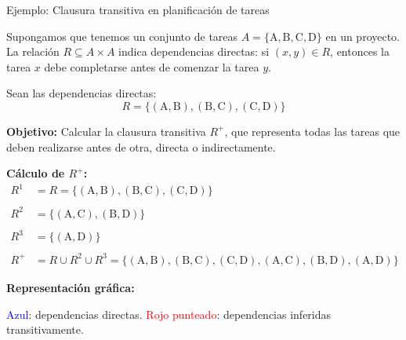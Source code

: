 \begin{exampleblock}{Ejemplo: Clausura transitiva en planificación de tareas}

Supongamos que tenemos un conjunto de tareas \( A = \{\text{A}, \text{B}, \text{C}, \text{D}\} \) en un proyecto. La relación \( R \subseteq A \times A \) indica dependencias directas: si \( (x, y) \in R \), entonces la tarea \( x \) debe completarse antes de comenzar la tarea \( y \).

Sean las dependencias directas:
\[
R = \{ (\text{A}, \text{B}), (\text{B}, \text{C}), (\text{C}, \text{D}) \}
\]

\textbf{Objetivo:} Calcular la clausura transitiva \( R^+ \), que representa todas las tareas que deben realizarse antes de otra, directa o indirectamente.

\textbf{Cálculo de \( R^+ \):}
\[
\begin{aligned}
R^1 &= R = \{ (\text{A}, \text{B}), (\text{B}, \text{C}), (\text{C}, \text{D}) \} \\\\
R^2 &= \{ (\text{A}, \text{C}), (\text{B}, \text{D}) \} \\\\
R^3 &= \{ (\text{A}, \text{D}) \} \\\\
R^+ &= R \cup R^2 \cup R^3 = \{ (\text{A}, \text{B}), (\text{B}, \text{C}), (\text{C}, \text{D}), (\text{A}, \text{C}), (\text{B}, \text{D}), (\text{A}, \text{D}) \}
\end{aligned}
\]

\textbf{Representación gráfica:}

\begin{center}
\end{center}

\vspace{1mm}
{\small
\textcolor{blue}{Azul}: dependencias directas. \quad
\textcolor{red}{Rojo punteado}: dependencias inferidas transitivamente.
}

\end{exampleblock}


